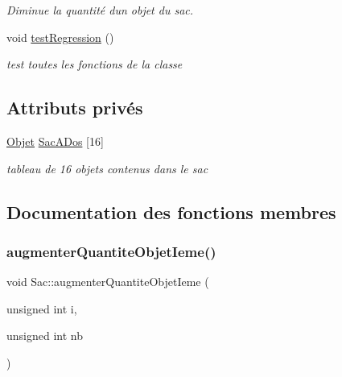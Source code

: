 \begin{DoxyCompactItemize}
\begin{DoxyCompactList}\small\item\em Diminue la quantité d\textquotesingle{}un objet du sac. \end{DoxyCompactList}\item 
\mbox{\label{class_sac_abe28c6d7970457e6ebf9850a762054e5}} 
void \hyperlink{class_sac_abe28c6d7970457e6ebf9850a762054e5}{test\+Regression} ()
\begin{DoxyCompactList}\small\item\em test toutes les fonctions de la classe \end{DoxyCompactList}\end{DoxyCompactItemize}
\subsection*{Attributs privés}
\begin{DoxyCompactItemize}
\item 
\mbox{\label{class_sac_a73cc9bc84514b23af99237d014bfb1b5}} 
\hyperlink{class_objet}{Objet} \hyperlink{class_sac_a73cc9bc84514b23af99237d014bfb1b5}{Sac\+A\+Dos} \mbox{[}16\mbox{]}
\begin{DoxyCompactList}\small\item\em tableau de 16 objets contenus dans le sac \end{DoxyCompactList}\end{DoxyCompactItemize}


\subsection{Documentation des fonctions membres}
\mbox{\label{class_sac_a1dee8b8525a1e9c00a8f0f3da5cdd4d2}} 
\subsubsection{\texorpdfstring{augmenter\+Quantite\+Objet\+Ieme()}{augmenterQuantiteObjetIeme()}}
{\footnotesize\ttfamily void Sac\+::augmenter\+Quantite\+Objet\+Ieme (\begin{DoxyParamCaption}\item[{unsigned int}]{i,  }\item[{unsigned int}]{nb }\end{DoxyParamCaption})}



